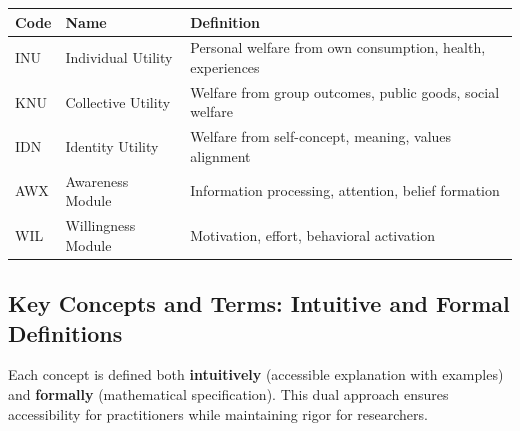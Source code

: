 \begin{center}
\renewcommand{\arraystretch}{1.3}
\begin{tabular}{llp{7cm}}
\hline
\textbf{Code} & \textbf{Name} & \textbf{Definition} \\
\hline
INU & Individual Utility & Personal welfare from own consumption, health, experiences \\
KNU & Collective Utility & Welfare from group outcomes, public goods, social welfare \\
IDN & Identity Utility & Welfare from self-concept, meaning, values alignment \\
\hline
AWX & Awareness Module & Information processing, attention, belief formation \\
WIL & Willingness Module & Motivation, effort, behavioral activation \\
\hline
\end{tabular}
\end{center}

\subsection{Key Concepts and Terms: Intuitive and Formal Definitions}
\label{sec:glossary-concepts}

Each concept is defined both \textbf{intuitively} (accessible explanation with examples) and \textbf{formally} (mathematical specification). This dual approach ensures accessibility for practitioners while maintaining rigor for researchers.

